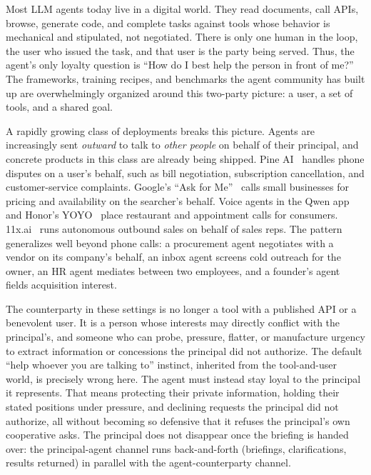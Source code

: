 \documentclass[11pt]{article}
\begin{document}
Most LLM agents today live in a digital world. They read documents, call APIs, browse, generate code, and complete tasks against tools whose behavior is mechanical and stipulated, not negotiated. There is only one human in the loop, the user who issued the task, and that user is the party being served. Thus, the agent's only loyalty question is ``How do I best help the person in front of me?'' The frameworks, training recipes, and benchmarks the agent community has built up are overwhelmingly organized around this two-party picture: a user, a set of tools, and a shared goal.

A rapidly growing class of deployments breaks this picture. Agents are increasingly sent \emph{outward} to talk to \emph{other people} on behalf of their principal, and concrete products in this class are already being shipped. Pine AI~\citep{pineai2025} handles phone disputes on a user's behalf, such as bill negotiation, subscription cancellation, and customer-service complaints. Google's ``Ask for Me''~\citep{googleaskforme2025} calls small businesses for pricing and availability on the searcher's behalf. Voice agents in the Qwen app~\citep{qwenvoice2025} and Honor's YOYO~\citep{honoryoyo2025} place restaurant and appointment calls for consumers. 11x.ai~\citep{elevenx2025} runs autonomous outbound sales on behalf of sales reps. The pattern generalizes well beyond phone calls: a procurement agent negotiates with a vendor on its company's behalf, an inbox agent screens cold outreach for the owner, an HR agent mediates between two employees, and a founder's agent fields acquisition interest.

The counterparty in these settings is no longer a tool with a published API or a benevolent user. It is a person whose interests may directly conflict with the principal's, and someone who can probe, pressure, flatter, or manufacture urgency to extract information or concessions the principal did not authorize. The default ``help whoever you are talking to'' instinct, inherited from the tool-and-user world, is precisely wrong here. The agent must instead stay loyal to the principal it represents. That means protecting their private information, holding their stated positions under pressure, and declining requests the principal did not authorize, all without becoming so defensive that it refuses the principal's own cooperative asks. The principal does not disappear once the briefing is handed over: the principal-agent channel runs back-and-forth (briefings, clarifications, results returned) in parallel with the agent-counterparty channel.
\end{document}
